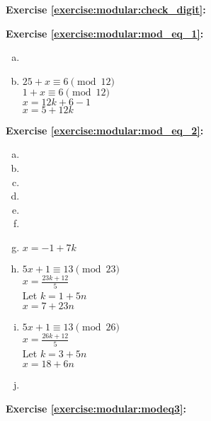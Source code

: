 \noindent\textbf{Exercise \ref{exercise:modular:check_digit}:}

\noindent\textbf{Exercise \ref{exercise:modular:mod_eq_1}:}
\begin{enumerate}[(a)]
\item

\item
$25+x \equiv 6 \pmod{12}$\\
$1+x \equiv 6 \pmod{12}$\\
$x= 12k+6-1$\\
$x=5+12k$
\end{enumerate}

\noindent\textbf{Exercise \ref{exercise:modular:mod_eq_2}:}
\begin{multicols}{2}
\begin{enumerate}[(a)]
\item
\item
\item
\item
\item
\item
\item
$x=-1+7k$

\item
$5x+1 \equiv 13 \pmod{23}$\\
$x= \displaystyle\frac{23k+12}{5}$\\
Let $k=1+5n$\\
$x=7+23n$

\item
$5x+1 \equiv 13 \pmod{26}$\\
$x= \displaystyle\frac{26k+12}{5}$\\
Let $k=3+5n$\\
$x=18+6n$

\item
\end{enumerate}
\end{multicols}

\noindent\textbf{Exercise \ref{exercise:modular:modeq3}:}

